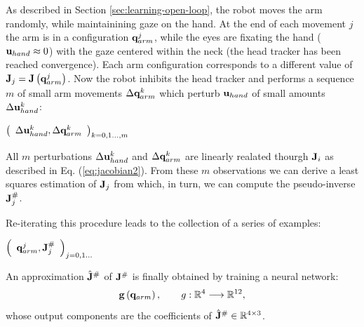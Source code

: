 As described in Section \ref{sec:learning-open-loop}, the robot 
moves the arm randomly, while maintainining gaze on the hand. At 
the end of each movement $j$ the arm is in a configuration 
$\mathbf q_{arm}^j$,  while the eyes are fixating the hand 
($\mathbf{u}_{hand} \approx 0$) with the gaze centered within the neck 
(the head tracker has been reached convergence). Each 
arm configuration corresponds to a different value of 
$\mathbf J_j=\mathbf J\left(\mathbf q_{arm}^j\right)$. 
Now the robot inhibits the head tracker and performs a sequence $m$
of small arm movements $\Delta \mathbf {q}_{arm}^k$ which perturb 
$\mathbf{u}_{hand}$ of small amounts $\Delta \mathbf {u}_{hand}^k$:
%
\begin{center}
\begin{math}
  \left(\begin{array}{cc}
    \Delta \mathbf {u}_{hand}^k , 
	\Delta \mathbf {q}_{arm}^k \end{array}
  \right)_{k = 0,1\dots,m}
\end{math}
\end{center}
%
All $m$ perturbations $\Delta \mathbf {u}_{hand}^k$ and 
$\Delta \mathbf {q}_{arm}^k$ are linearly realated thourgh $\mathbf J_i$ 
as described in Eq. (\ref{eq:jacobian2}). From these $m$ 
observations we can derive a least squares estimation of $\mathbf J_j$ from 
which, in turn, we can compute the pseudo-inverse $\mathbf J_j^\#$. 

Re-iterating this procedure leads to the collection of a series of examples:
%
\begin{center}
\begin{math}
  \left(\begin{array}{cc}
    \mathbf q_{arm}^j , \mathbf J_j^\# \end{array}\right)_{j = 0,1\dots}
\end{math}
\end{center}
%
An approximation $\hat{\mathbf J}^\#$ of $\mathbf J^\#$ is finally
obtained by training a neural network:
%
\begin{equation}
\mathbf{g}\left(\mathbf q_{arm}\right), \qquad g : \mathbb R^4 \longrightarrow \mathbb R^{12},
\end{equation}
%
whose output components are the coefficients of 
$\hat{\mathbf J}^\# \in \mathbb R^{4 \times 3}$.

